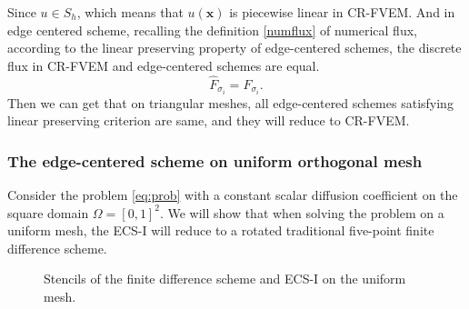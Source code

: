 \documentclass[times,review,preprint]{elsarticle}
\newcommand{\bx}{\bm{x}}
\begin{document}
Since $u \in S_h$, which means that $u(\bx)$ is piecewise linear in CR-FVEM. And in edge centered scheme, recalling the definition \cref{numflux} of numerical flux, according to the linear preserving property of edge-centered schemes, the discrete flux in CR-FVEM and edge-centered schemes are equal.
$$ \hat{F}_{\sigma_{i}} = F_{\sigma_{i}}. $$
Then we can get that on triangular meshes, all edge-centered schemes satisfying linear preserving criterion are same, and they will reduce to CR-FVEM.

\subsubsection{The edge-centered scheme on uniform orthogonal mesh}

Consider the problem \cref{eq:prob} with a constant scalar diffusion coefficient on the square domain $\Omega = [0,1]^2$. We will show that when solving the problem on a uniform mesh, the ECS-I will reduce to a rotated traditional five-point finite difference scheme.

\begin{figure}[h]
\centering
{}
\caption{Stencils of the finite difference scheme and ECS-I on the uniform mesh.}
\end{figure}
\end{document}
